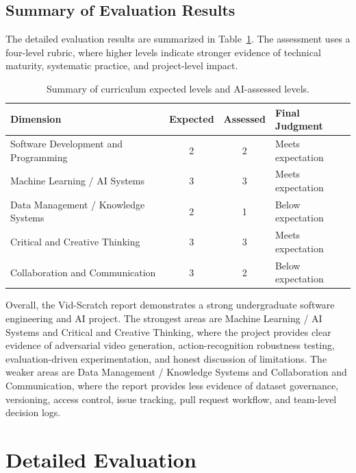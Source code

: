 \subsection{Summary of Evaluation Results}
\label{subsection:evaluation-summary-table}

The detailed evaluation results are summarized in
Table~\ref{tab:rubric-evaluation-summary}. The assessment uses a
four-level rubric, where higher levels indicate stronger evidence of
technical maturity, systematic practice, and project-level impact.

\begin{table}[H]
\centering
\caption{Summary of curriculum expected levels and AI-assessed levels.}
\label{tab:rubric-evaluation-summary}
\renewcommand{\arraystretch}{1.3}
\begin{tabularx}{\textwidth}{|X|c|c|X|}
\hline
\textbf{Dimension} & \textbf{Expected} & \textbf{Assessed} & \textbf{Final Judgment} \\
\hline
Software Development and Programming & 2 & 2 & Meets expectation \\
\hline
Machine Learning / AI Systems & 3 & 3 & Meets expectation \\
\hline
Data Management / Knowledge Systems & 2 & 1 & Below expectation \\
\hline
Critical and Creative Thinking & 3 & 3 & Meets expectation \\
\hline
Collaboration and Communication & 3 & 2 & Below expectation \\
\hline
\end{tabularx}
\end{table}

Overall, the Vid-Scratch report demonstrates a strong undergraduate
software engineering and AI project. The strongest areas are Machine
Learning / AI Systems and Critical and Creative Thinking, where the
project provides clear evidence of adversarial video generation,
action-recognition robustness testing, evaluation-driven
experimentation, and honest discussion of limitations. The weaker
areas are Data Management / Knowledge Systems and Collaboration and
Communication, where the report provides less evidence of dataset
governance, versioning, access control, issue tracking, pull request
workflow, and team-level decision logs.

\section{Detailed Evaluation}
\label{section:detailed-evaluation}

